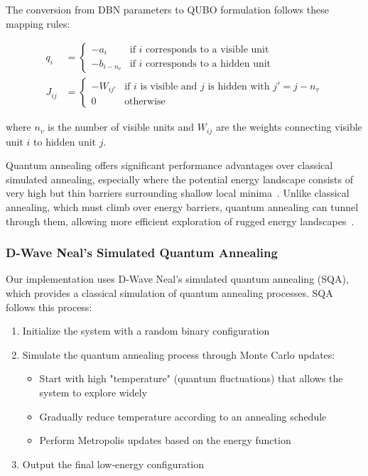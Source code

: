 \documentclass[10pt,twocolumn,letterpaper]{article}
\begin{document}
The conversion from DBN parameters to QUBO formulation follows these mapping rules:

\begin{align}
q_i &= 
\begin{cases}
-a_i & \text{if $i$ corresponds to a visible unit} \\
-b_{i-n_v} & \text{if $i$ corresponds to a hidden unit}
\end{cases} \\
J_{ij} &= 
\begin{cases}
-W_{ij'} & \text{if $i$ is visible and $j$ is hidden with $j' = j - n_v$} \\
0 & \text{otherwise}
\end{cases}
\end{align}

where $n_v$ is the number of visible units and $W_{ij}$ are the weights connecting visible unit $i$ to hidden unit $j$.

Quantum annealing offers significant performance advantages over classical simulated annealing, especially where the potential energy landscape consists of very high but thin barriers surrounding shallow local minima~\cite{kadowaki1998quantum, kirkpatrick1983optimization}. Unlike classical annealing, which must climb over energy barriers, quantum annealing can tunnel through them, allowing more efficient exploration of rugged energy landscapes~\cite{dwave2025beyond}.

\subsubsection{D-Wave Neal's Simulated Quantum Annealing}
Our implementation uses D-Wave Neal's simulated quantum annealing (SQA), which provides a classical simulation of quantum annealing processes. SQA follows this process:

\begin{enumerate}
    \item Initialize the system with a random binary configuration
    \item Simulate the quantum annealing process through Monte Carlo updates:
    \begin{itemize}
        \item Start with high "temperature" (quantum fluctuations) that allows the system to explore widely
        \item Gradually reduce temperature according to an annealing schedule
        \item Perform Metropolis updates based on the energy function
    \end{itemize}
    \item Output the final low-energy configuration
\end{enumerate}
\end{document}
